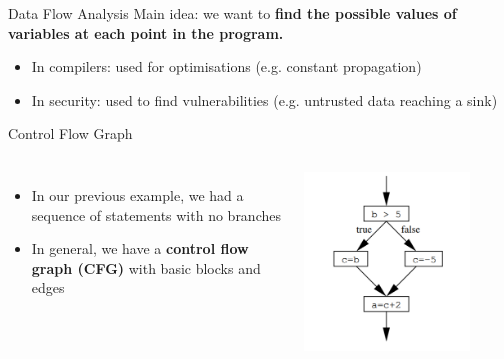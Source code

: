 \documentclass[aspectratio=169,xcolor=dvipsnames]{beamer}
\begin{document}
\begin{frame}{Data Flow Analysis}
	Main idea: we want to {\bf find the possible values of variables at each point in the program.}

	\bigskip
	\begin{itemize}
		\item In compilers: used for optimisations (e.g. constant propagation)
		\item In security: used to find vulnerabilities (e.g. untrusted data reaching a sink)
	\end{itemize}
\end{frame}


\begin{frame}[fragile]{Control Flow Graph}
	\begin{columns}[c] %


		\begin{itemize}
			\item In our previous example, we had a sequence of statements with no branches
			\item In general, we have a {\bf control flow graph (CFG)} with basic blocks and edges
		\end{itemize}

		\includegraphics[width=0.8\textwidth]{img/2.png}
	\end{columns}
\end{frame}
\end{document}
